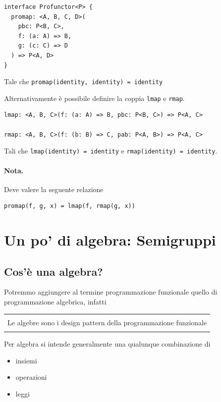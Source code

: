 \documentclass[12pt]{article}
\newenvironment{demo}
    {\begin{center}
    \begin{tabular}{|p{0.9\textwidth}|}
    \hline\\
    }
    {
    \\\\\hline
    \end{tabular}
    \end{center}
    }
\begin{document}
\begin{verbatim}
interface Profunctor<P> {
  promap: <A, B, C, D>(
    pbc: P<B, C>,
    f: (a: A) => B,
    g: (c: C) => D
  ) => P<A, D>
}
\end{verbatim}

Tale che \texttt{promap(identity, identity) = identity}

Alternativamente è possibile definire la coppia \texttt{lmap} e \texttt{rmap}.

\begin{verbatim}
lmap: <A, B, C>(f: (a: A) => B, pbc: P<B, C>) => P<A, C>

rmap: <A, B, C>(f: (b: B) => C, pab: P<A, B>) => P<A, C>
\end{verbatim}

Tali che \texttt{lmap(identity) = identity} e \texttt{rmap(identity) = identity}.

\paragraph{Nota. } Deve valere la seguente relazione

\begin{verbatim}
promap(f, g, x) = lmap(f, rmap(g, x))
\end{verbatim}

\newpage

\section{Un po' di algebra: Semigruppi}

\subsection{Cos'è una algebra?}

Potremmo aggiungere al termine programmazione funzionale quello di programmazione algebrica, infatti

\begin{demo}
Le algebre sono i design pattern della programmazione funzionale
\end{demo}

Per algebra si intende generalmente una qualunque combinazione di

\begin{itemize}
  \item insiemi
  \item operazioni
  \item leggi
\end{itemize}
\end{document}
